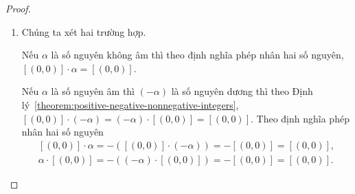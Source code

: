 \begin{proof}
    \begin{enumerate}[label={(\roman*)}]
        \item Chúng ta xét hai trường hợp.

              Nếu $\alpha$ là số nguyên không âm thì theo định nghĩa phép nhân hai số nguyên, $[(0, 0)]\cdot\alpha = [(0, 0)]$.

              Nếu $\alpha$ là số nguyên âm thì $(-\alpha)$ là số nguyên dương thì theo Định lý~\ref{theorem:positive-negative-nonnegative-integers}, $[(0, 0)]\cdot (-\alpha) = (-\alpha)\cdot [(0, 0)] = [(0, 0)]$. Theo định nghĩa phép nhân hai số nguyên
              \[
                  \begin{split}
                      [(0, 0)]\cdot\alpha = -([(0, 0)]\cdot (-\alpha)) = -[(0,0)] = [(0, 0)], \\
                      \alpha\cdot[(0, 0)] = -((-\alpha)\cdot [(0, 0)]) = -[(0,0)] = [(0, 0)].
                  \end{split}
              \]


\end{enumerate}
\end{proof}
